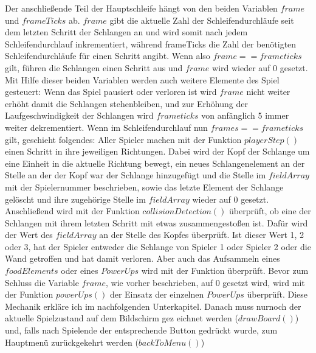 Der anschließende Teil der Hauptschleife hängt von den beiden Variablen $frame$ und $frameTicks$ ab. $frame$ gibt die aktuelle Zahl der Schleifendurchläufe seit dem letzten Schritt der Schlangen an und wird somit nach jedem Schleifendurchlauf inkrementiert, während frameTicks die Zahl der benötigten Schleifendurchläufe für einen Schritt angibt. Wenn also $frame == frameticks$ gilt, führen die Schlangen einen Schritt aus und $frame$ wird wieder auf 0 gesetzt. Mit Hilfe dieser beiden Variablen werden auch weitere Elemente des Spiel gesteuert: Wenn das Spiel pausiert oder verloren ist wird $frame$ nicht weiter erhöht damit die Schlangen stehenbleiben, und zur Erhöhung der Laufgeschwindigkeit der Schlangen wird $frameticks$ von anfänglich 5 immer weiter dekrementiert. Wenn im Schleifendurchlauf nun $frames == frameticks$ gilt, geschieht folgendes: Aller Spieler machen mit der Funktion $playerStep()$ einen Schritt in ihre jeweiligen Richtungen. Dabei wird der Kopf der Schlange um eine Einheit in die aktuelle Richtung bewegt, ein neues Schlangenelement an der Stelle an der der Kopf war der Schlange hinzugefügt und die Stelle im $fieldArray$ mit der Spielernummer beschrieben, sowie das letzte Element der Schlange gelöscht und ihre zugehörige Stelle im $fieldArray$ wieder auf 0 gesetzt. Anschließend wird mit der Funktion $collisionDetection()$ überprüft, ob eine der Schlangen mit ihrem letzten Schritt mit etwas zusammengestoßen ist. Dafür wird der Wert des $fieldArray$ an der Stelle des Kopfes überprüft. Ist dieser Wert 1, 2 oder 3, hat der Spieler entweder die Schlange von Spieler 1 oder Spieler 2 oder die Wand getroffen und hat damit verloren. Aber auch das Aufsammeln eines $foodElements$ oder eines $PowerUps$ wird mit der Funktion überprüft. Bevor zum Schluss die Variable $frame$, wie vorher beschrieben, auf 0 gesetzt wird, wird mit der Funktion $powerUps()$ der Einsatz der einzelnen $PowerUps$ überprüft. Diese Mechanik erkläre ich im nachfolgenden Unterkapitel.
Danach muss nurnoch der aktuelle Spielzustand auf dem Bildschirm gez	eichnet werden ($drawBoard()$) und, falls nach Spielende der entsprechende Button gedrückt wurde, zum Hauptmenü zurückgekehrt werden ($backToMenu()$)
%



